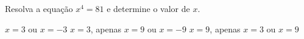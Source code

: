 Resolva a equação $x^4=81$ e determine o valor de $x$.

$x=3$ ou $x=-3$
$x=3$, apenas
$x=9$ ou $x=-9$
$x=9$, apenas
$x=3$ ou $x=9$


